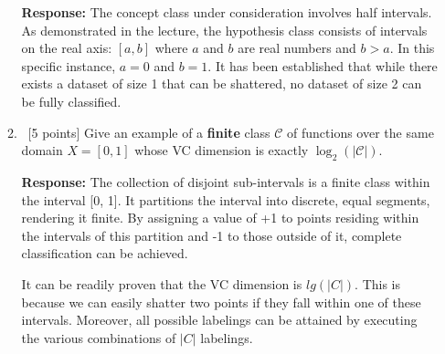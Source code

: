 \begin{enumerate}
\begin{enumerate}
    \textbf{Response:} The concept class under consideration involves half intervals. As demonstrated in the lecture, the hypothesis class consists of intervals on the real axis: $[a, b]$ where $a$ and $b$ are real numbers and $b > a$. In this specific instance, $a = 0$ and $b = 1$. It has been established that while there exists a dataset of size 1 that can be shattered, no dataset of size 2 can be fully classified.

  \item ~[5 points] Give an example of a {\bf finite} class
    $\mathcal{C}$ of functions over the same domain $X = [0,1]$ whose
    VC dimension is exactly $\log_2(|\mathcal{C}|)$.
	
	\textbf{Response:} The collection of disjoint sub-intervals is a finite class within the interval [0, 1]. It partitions the interval into discrete, equal segments, rendering it finite. By assigning a value of +1 to points residing within the intervals of this partition and -1 to those outside of it, complete classification can be achieved.
	
	It can be readily proven that the VC dimension is $lg(|C|)$. This is because we can easily shatter two points if they fall within one of these intervals. Moreover, all possible labelings can be attained by executing the various combinations of $|C|$ labelings.
  \end{enumerate}
  
\end{enumerate}
